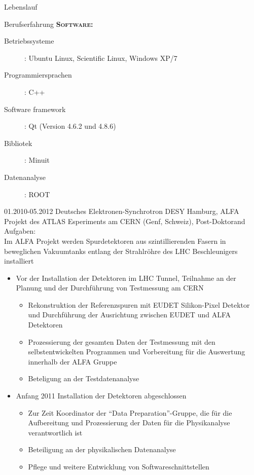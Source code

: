 \documentclass[11pt,a4paper]{scrartcl}
\begin{document}
\begin{cv}{Lebenslauf}
\begin{cvlist}{Berufserfahrung}
      {\scshape {\bfseries Software:}}
      \begin{description} 
      \item[Betriebssysteme] : Ubuntu Linux, Scientific Linux, Windows
        XP/7
      \item[Programmiersprachen] : C++
      \item[Software framework] : Qt (Version 4.6.2 und 4.8.6)
      \item[Bibliotek] : Minuit
      \item[Datenanalyse] : ROOT
      \end{description}
    
  \item[01.2010-05.2012] Deutsches Elektronen-Synchrotron DESY
    Hamburg, ALFA Projekt des ATLAS Esperiments am CERN (Genf,
    Schweiz), Post-Doktorand \\
    
    Aufgaben:\\
    
    Im ALFA Projekt werden Spurdetektoren aus szintillierenden Fasern
    in beweglichen Vakuumtanks entlang der Strahlr{\"o}hre des LHC
    Beschleunigers installiert
    \begin{itemize}
    \item Vor der Installation der Detektoren im LHC Tunnel, Teilnahme
      an der Planung und der Durchf{\"u}hrung von Testmessung am CERN
      \begin{itemize}
      \item Rekonstruktion der Referenzspuren mit EUDET Silikon-Pixel
        Detektor und Durchf{\"u}hrung der Ausrichtung zwischen EUDET
        und ALFA Detektoren 
      \item Prozessierung der gesamten Daten der Testmessung mit den
        selbstentwickelten Programmen und Vorbereitung f{\"u}r die
        Auswertung innerhalb der ALFA Gruppe
      \item Beteligung an der Testdatenanalyse
      \end{itemize}           
    \item Anfang 2011 Installation der Detektoren abgeschlossen
      \begin{itemize}
      \item Zur Zeit Koordinator der "`Data Preparation"'-Gruppe, die
        f{\"u}r die Aufbereitung und Prozessierung der Daten f{\"u}r
        die Physikanalyse verantwortlich ist
      \item Beteiligung an der physikalischen Datenanalyse
      \item Pflege und weitere Entwicklung von Softwareschnittstellen
      \end{itemize} 
    \end{itemize}


\end{cvlist}
\end{cv}
\end{document}
